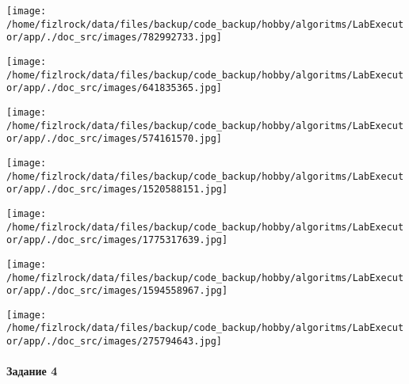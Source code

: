 \documentclass[a4paper, 12pt]{article}
\begin{document}
\texttt{[image: /home/fizlrock/data/files/backup/code\_backup/hobby/algoritms/LabExecutor/app/./doc\_src/images/782992733.jpg]}

\texttt{[image: /home/fizlrock/data/files/backup/code\_backup/hobby/algoritms/LabExecutor/app/./doc\_src/images/641835365.jpg]}

\texttt{[image: /home/fizlrock/data/files/backup/code\_backup/hobby/algoritms/LabExecutor/app/./doc\_src/images/574161570.jpg]}

\texttt{[image: /home/fizlrock/data/files/backup/code\_backup/hobby/algoritms/LabExecutor/app/./doc\_src/images/1520588151.jpg]}

\texttt{[image: /home/fizlrock/data/files/backup/code\_backup/hobby/algoritms/LabExecutor/app/./doc\_src/images/1775317639.jpg]}

\texttt{[image: /home/fizlrock/data/files/backup/code\_backup/hobby/algoritms/LabExecutor/app/./doc\_src/images/1594558967.jpg]}

\texttt{[image: /home/fizlrock/data/files/backup/code\_backup/hobby/algoritms/LabExecutor/app/./doc\_src/images/275794643.jpg]}
\pagebreak
\paragraph{Задание 4}
\end{document}

